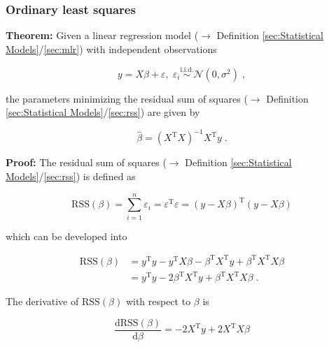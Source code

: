 \documentclass[a4paper,12pt,twoside]{book}
\begin{document}
\subsubsection[\textbf{Ordinary least squares}]{Ordinary least squares} \label{sec:mlr-ols2}
\setcounter{equation}{0}

\textbf{Theorem:} Given a linear regression model ($\rightarrow$ Definition \ref{sec:Statistical Models}/\ref{sec:mlr}) with independent observations

\begin{equation} \label{eq:mlr-ols2-MLR}
y = X\beta + \varepsilon, \; \varepsilon_i \overset{\mathrm{i.i.d.}}{\sim} \mathcal{N}(0, \sigma^2) \; ,
\end{equation}

the parameters minimizing the residual sum of squares ($\rightarrow$ Definition \ref{sec:Statistical Models}/\ref{sec:rss}) are given by

\begin{equation} \label{eq:mlr-ols2-OLS}
\hat{\beta} = (X^\mathrm{T} X)^{-1} X^\mathrm{T} y \; .
\end{equation}


\vspace{1em}
\textbf{Proof:} The residual sum of squares ($\rightarrow$ Definition \ref{sec:Statistical Models}/\ref{sec:rss}) is defined as

\begin{equation} \label{eq:mlr-ols2-RSS}
\mathrm{RSS}(\beta) = \sum_{i=1}^n \varepsilon_i = \varepsilon^\mathrm{T} \varepsilon = (y-X\beta)^\mathrm{T} (y-X\beta)
\end{equation}

which can be developed into

\begin{equation} \label{eq:mlr-ols2-RSS-dev}
\begin{split}
\mathrm{RSS}(\beta) &= y^\mathrm{T} y - y^\mathrm{T} X \beta - \beta^\mathrm{T} X^\mathrm{T} y + \beta^\mathrm{T} X^\mathrm{T} X \beta \\
&= y^\mathrm{T} y - 2 \beta^\mathrm{T} X^\mathrm{T} y + \beta^\mathrm{T} X^\mathrm{T} X \beta \; .
\end{split}
\end{equation}

The derivative of $\mathrm{RSS}(\beta)$ with respect to $\beta$ is

\begin{equation} \label{eq:mlr-ols2-RSS-der}
\frac{\mathrm{d}\mathrm{RSS}(\beta)}{\mathrm{d}\beta} = - 2 X^\mathrm{T} y + 2 X^\mathrm{T} X \beta
\end{equation}
\end{document}
